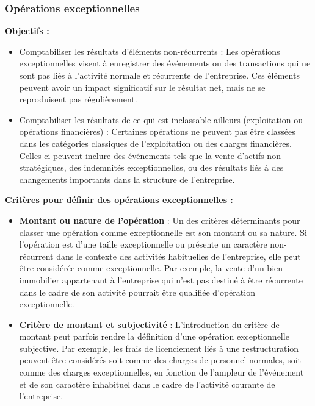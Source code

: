 \documentclass[a4paper, 12pt]{report}
\begin{document}
\subsubsection{Opérations exceptionnelles}

\textbf{Objectifs :} 
\begin{itemize}
	\item Comptabiliser les résultats d’éléments non-récurrents : Les opérations exceptionnelles visent à enregistrer des événements ou des transactions qui ne sont pas liés à l’activité normale et récurrente de l’entreprise. Ces éléments peuvent avoir un impact significatif sur le résultat net, mais ne se reproduisent pas régulièrement.
	
	\item Comptabiliser les résultats de ce qui est inclassable ailleurs (exploitation ou opérations financières) : Certaines opérations ne peuvent pas être classées dans les catégories classiques de l’exploitation ou des charges financières. Celles-ci peuvent inclure des événements tels que la vente d'actifs non-stratégiques, des indemnités exceptionnelles, ou des résultats liés à des changements importants dans la structure de l'entreprise.
\end{itemize}

\textbf{Critères pour définir des opérations exceptionnelles :} 
\begin{itemize}
	\item \textbf{Montant ou nature de l'opération} : Un des critères déterminants pour classer une opération comme exceptionnelle est son montant ou sa nature. Si l'opération est d'une taille exceptionnelle ou présente un caractère non-récurrent dans le contexte des activités habituelles de l'entreprise, elle peut être considérée comme exceptionnelle. Par exemple, la vente d'un bien immobilier appartenant à l'entreprise qui n'est pas destiné à être récurrente dans le cadre de son activité pourrait être qualifiée d’opération exceptionnelle.
	
	\item \textbf{Critère de montant et subjectivité} : L'introduction du critère de montant peut parfois rendre la définition d'une opération exceptionnelle subjective. Par exemple, les frais de licenciement liés à une restructuration peuvent être considérés soit comme des charges de personnel normales, soit comme des charges exceptionnelles, en fonction de l'ampleur de l'événement et de son caractère inhabituel dans le cadre de l’activité courante de l'entreprise.
\end{itemize}
\end{document}
